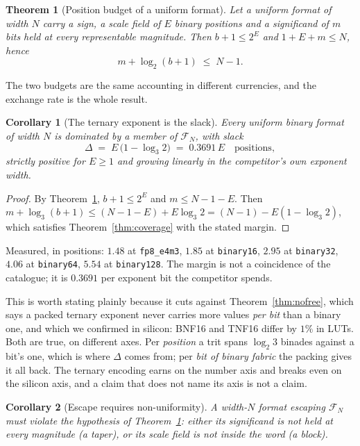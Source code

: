 \documentclass[11pt]{article}
\newtheorem{theorem}{Theorem}
\newtheorem{corollary}{Corollary}
\theoremstyle{definition}
\begin{document}
\begin{theorem}[Position budget of a uniform format]
\label{thm:budget}
Let a \emph{uniform} format of width $N$ carry a sign, a scale field of $E$ binary
positions and a significand of $m$ bits held at every representable magnitude.
Then $b+1 \le 2^{E}$ and $1+E+m \le N$, hence
\[
  m + \log_2(b+1) \;\le\; N-1 .
\]
\end{theorem}

The two budgets are the same accounting in different currencies, and the exchange
rate is the whole result.

\begin{corollary}[The ternary exponent is the slack]
\label{cor:slack}
Every uniform binary format of width $N$ is dominated by a member of
$\mathcal{F}_N$, with slack
\[
  \Delta \;=\; E\,\bigl(1 - \log_3 2\bigr) \;=\; 0.3691\,E \quad\text{positions},
\]
strictly positive for $E \ge 1$ and growing linearly in the competitor's own
exponent width.
\end{corollary}
\begin{proof}
By Theorem~\ref{thm:budget}, $b+1 \le 2^E$ and $m \le N-1-E$. Then
$m + \log_3(b+1) \le (N-1-E) + E\log_3 2 = (N-1) - E(1-\log_3 2)$, which satisfies
Theorem~\ref{thm:coverage} with the stated margin.
\end{proof}

Measured, in positions: $1.48$ at \texttt{fp8\_e4m3}, $1.85$ at
\texttt{binary16}, $2.95$ at \texttt{binary32}, $4.06$ at \texttt{binary64},
$5.54$ at \texttt{binary128}. The margin is not a coincidence of the catalogue; it
is $0.3691$ per exponent bit the competitor spends.

This is worth stating plainly because it cuts against
Theorem~\ref{thm:nofree}, which says a packed ternary exponent never carries
more values \emph{per bit} than a binary one, and which we confirmed in silicon:
BNF16 and TNF16 differ by $1\%$ in LUTs. Both are true, on different axes. Per
\emph{position} a trit spans $\log_2 3$ binades against a bit's one, which is
where $\Delta$ comes from; per \emph{bit of binary fabric} the packing gives it
all back. The ternary encoding earns on the number axis and breaks even on the
silicon axis, and a claim that does not name its axis is not a claim.

\begin{corollary}[Escape requires non-uniformity]
\label{cor:escape}
A width-$N$ format escaping $\mathcal{F}_N$ must violate the hypothesis of
Theorem~\ref{thm:budget}: either its significand is not held at every magnitude
(a taper), or its scale field is not inside the word (a block).
\end{corollary}
\end{document}

